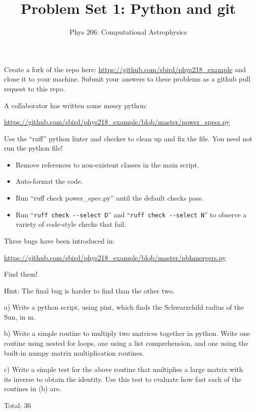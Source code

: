 \documentclass[10pt]{article}
\newenvironment{problem}[2][Problem]{\begin{trivlist}
\item[\hskip \labelsep {\bfseries #1}\hskip \labelsep {\bfseries #2}]}{\end{trivlist}}
\begin{document}
\title{Problem Set 1: Python and git}
\author{Phys 206: Computational Astrophysics}
\maketitle

\begin{problem}{1.0 Github (4)}
Create a fork of the repo here: \url{https://github.com/sbird/phys218_example}
 and clone it to your machine. Submit your answers to these problems as a github pull request to this repo.
\end{problem}

\begin{problem}{1.1 Cleanups (10)}
A collaborator has written some messy python:

\url{https://github.com/sbird/phys218_example/blob/master/power_specs.py}

Use the ``ruff'' python linter and checker to clean up and fix the file. You need not run the python file!
\begin{itemize}
 \item Remove references to non-existent classes in the main script.
\item Auto-format the code.
\item Run ``ruff check power\_spec.py'' until the default checks pass.
\item Run ``\verb|ruff check --select D|'' and ``\verb|ruff check --select N|'' to observe a variety of code-style checks that fail.
\end{itemize}
\end{problem}

\begin{problem}{1.2 Find the bug (6)}
Three bugs have been introduced in:

\url{https://github.com/sbird/phys218_example/blob/master/pbhmergers.py}

Find them!

Hint: The final bug is harder to find than the other two.
\end{problem}

\begin{problem}{1.3 Writing python (10)}

a) Write a python script, using pint, which finds the Schwarzchild radius of the Sun, in m.

b) Write a simple routine to multiply two matrices together in python. Write one routine using nested for loops, one using a list comprehension, and one using the built-in numpy matrix multiplication routines.

c) Write a simple test for the above routine that multiplies a large matrix with its inverse to obtain the identity. Use this test to evaluate how fast each of the routines in (b) are.
\end{problem}

Total: 36
\end{document}
